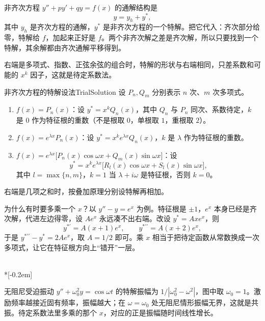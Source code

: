 非齐次方程 $y''+py'+qy=f(x)$ 的通解结构是
\[
  y=y_h+y^*,
\]
其中 $y_h$ 是齐次方程的通解，$y^*$ 是非齐次方程的一个特解。把它代入：齐次部分给零，特解给 $f$，加起来正好是 $f$。两个非齐次解之差是齐次解，所以只要找到一个特解，其余解都由齐次通解平移得到。

右端是多项式、指数、正弦余弦的组合时，特解的形状与右端相同，只差系数和可能的 $x^k$ 因子，这就是待定系数法。

\begin{conclusion}{非齐次方程的特解设法}{TrialSolution}
设 $P_n,Q_m$ 分别表示 $n$ 次、$m$ 次多项式。
\begin{enumerate}[itemsep=3pt,topsep=3pt]
  \item $f(x)=P_n(x)$：设 $y^*=x^kQ_n(x)$，其中 $Q_n$ 与 $P_n$ 同次、系数待定，$k$ 是 $0$ 作为特征根的重数（不是根取 $0$，单根取 $1$，重根取 $2$）。
  \item $f(x)=e^{\lambda x}P_n(x)$：设 $y^*=x^ke^{\lambda x}Q_n(x)$，$k$ 是 $\lambda$ 作为特征根的重数。
  \item $f(x)=e^{\lambda x}\bigl[P_n(x)\cos\omega x+Q_m(x)\sin\omega x\bigr]$：设
  \[
    y^*=x^ke^{\lambda x}\bigl[R_l(x)\cos\omega x+S_l(x)\sin\omega x\bigr],
  \]
  其中 $l=\max\{n,m\}$，$k=1$ 当 $\lambda+i\omega$ 是特征根，否则 $k=0$。
\end{enumerate}
右端是几项之和时，按叠加原理分别设特解再相加。
\end{conclusion}

为什么有时要多乘一个 $x$？以 $y''-y=e^x$ 为例。特征根是 $\pm1$，$e^x$ 本身已经是齐次解，代进左边得零，设 $Ae^x$ 永远凑不出右端。改设 $y^*=Axe^x$，则
\[
  y^{*\prime}=A(x+1)e^x,\qquad
  y^{*\prime\prime}=A(x+2)e^x,
\]
于是 $y^{*\prime\prime}-y^*=2Ae^x$，取 $A=1/2$ 即可。乘 $x$ 相当于把待定函数从常数换成一次多项式，让它在特征根方向上“错开”一层。

\begin{center}
\\*[-0.2em]
\parbox{0.86\linewidth}{\centering\footnotesize
无阻尼受迫振动 $y''+\omega_0^2y=\cos\omega t$ 的特解振幅为 $1/|\omega_0^2-\omega^2|$，图中取 $\omega_0=1$。激励频率越接近固有频率，振幅越大；在 $\omega=\omega_0$ 处无阻尼情形振幅无界，这就是共振。待定系数法里多乘的那个 $x$，对应的正是振幅随时间线性增长。}
\end{center}

